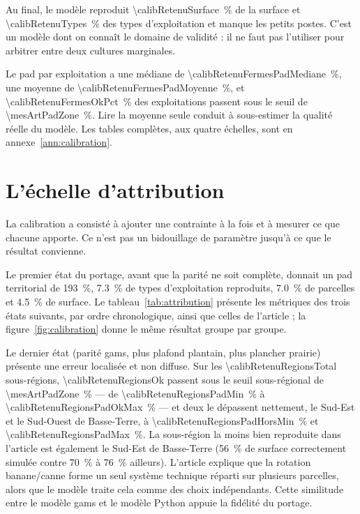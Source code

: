 Au final, le modèle reproduit \SI{\calibRetenuSurface}{\percent} de la surface et
\SI{\calibRetenuTypes}{\percent} des types d'exploitation et manque les petits postes. C'est un
modèle dont on connaît le domaine de validité : il ne faut pas l'utiliser pour arbitrer entre
deux cultures marginales.

Le \gls{pad} par exploitation a une médiane de \SI{\calibRetenuFermesPadMediane}{\percent}, une
moyenne de \SI{\calibRetenuFermesPadMoyenne}{\percent}, et
\SI{\calibRetenuFermesOkPct}{\percent} des exploitations passent sous le seuil de
\SI{\mesArtPadZone}{\percent}. Lire la moyenne seule conduit à sous-estimer la qualité réelle du
modèle. Les tables complètes, aux quatre échelles, sont en annexe~\ref{ann:calibration}.

\section{L'échelle d'attribution}
\label{sec:attribution}

La calibration a consisté à ajouter une contrainte à la fois et à mesurer ce que chacune
apporte. Ce n'est pas un bidouillage de paramètre jusqu'à ce que le résultat convienne.

Le premier état du portage, avant que la parité ne soit complète, donnait un \gls{pad}
territorial de \SI{193}{\percent}, \SI{7.3}{\percent} de types d'exploitation reproduits,
\SI{7.0}{\percent} de parcelles et \SI{4.5}{\percent} de surface. Le
tableau~\ref{tab:attribution} présente les métriques des trois états suivants, par ordre
chronologique, ainsi que celles de l'article ; la figure~\ref{fig:calibration} donne le même
résultat groupe par groupe.

Le dernier état (parité \gls{gams}, plus plafond plantain, plus plancher prairie) présente une
erreur localisée et non diffuse. Sur les \num{\calibRetenuRegionsTotal} sous-régions,
\num{\calibRetenuRegionsOk} passent sous le seuil sous-régional de
\SI{\mesArtPadZone}{\percent} — de \SI{\calibRetenuRegionsPadMin}{\percent} à
\SI{\calibRetenuRegionsPadOkMax}{\percent} — et deux le dépassent nettement, le Sud-Est et le
Sud-Ouest de Basse-Terre, à \SI{\calibRetenuRegionsPadHorsMin}{\percent} et
\SI{\calibRetenuRegionsPadMax}{\percent}. La sous-région la moins bien reproduite dans l'article
est également le Sud-Est de Basse-Terre (\SI{56}{\percent} de surface correctement simulée
contre \SI{70}{\percent} à \SI{76}{\percent} ailleurs). L'article explique que la rotation
banane/canne forme un seul système technique réparti sur plusieurs parcelles, alors que le
modèle traite cela comme des choix indépendants. Cette similitude entre le modèle \gls{gams} et
le modèle Python appuie la fidélité du portage.

